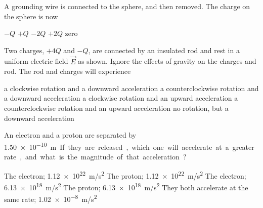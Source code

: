 \documentclass{../../oss-classkick-exam}
\begin{document}
\begin{multicols*}{2}
\begin{questions}
    \question A grounding wire is connected to the sphere, and then removed. The
    charge on the sphere is now
    \begin{choices}
      \choice $-Q$
      \choice $+Q$
      \choice $-2Q$
      \choice $+2Q$
      \choice zero
    \end{choices}
    \label{cond2}
  
    \question Two charges, $+4Q$ and $-Q$, are connected by an insulated rod and
    rest in a uniform electric field $\vec E$ as shown. Ignore the effects of
    gravity on the charges and rod. The rod and charges will experience
    \begin{choices}
      \choice a clockwise rotation and a downward acceleration
      \choice a counterclockwise rotation and a downward acceleration
      \choice a clockwise rotation and an upward acceleration
      \choice a counterclockwise rotation and an upward acceleration
      \choice no rotation, but a downward acceleration
    \end{choices}
    \vspace{.7in}
  
    \question An electron and a proton are separated by \SI{1.50e-10}\metre. If
    they are released, which one will accelerate at a greater rate, and what is
    the magnitude of that acceleration?
    \begin{choices}
      \choice The electron; \SI{1.12e22}{m/s^2}
      \choice The proton; \SI{1.12e22}{m/s^2}
      \choice The electron; \SI{6.13e18}{m/s^2}
      \choice The proton; \SI{6.13e18}{m/s^2}
      \choice They both accelerate at the same rate; \SI{1.02e-8}{m/s^2}
    \end{choices}
    \columnbreak
  

\end{questions}
\end{multicols*}
\end{document}
